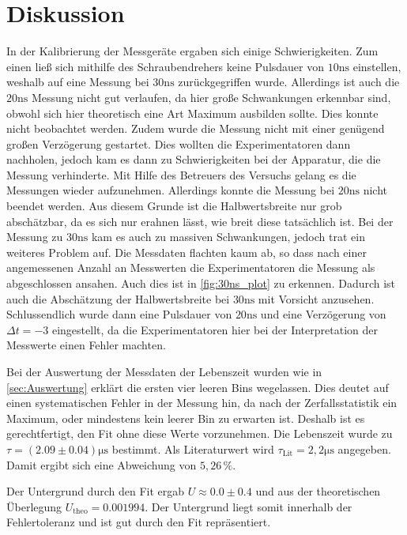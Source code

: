 \section{Diskussion}
\label{sec:Diskussion}

In der Kalibrierung der Messgeräte ergaben sich einige Schwierigkeiten.
Zum einen ließ sich mithilfe des Schraubendrehers keine Pulsdauer von $10 \unit{\nano\second}$ einstellen, weshalb auf eine Messung bei $30 \unit{\nano\second}$ zurückgegriffen wurde.
Allerdings ist auch die $20 \unit{\nano\second}$ Messung nicht gut verlaufen, da hier große Schwankungen erkennbar sind, obwohl sich hier theoretisch eine Art Maximum ausbilden sollte.
Dies konnte nicht beobachtet werden.
Zudem wurde die Messung nicht mit einer genügend großen Verzögerung gestartet.
Dies wollten die Experimentatoren dann nachholen, jedoch kam es dann zu Schwierigkeiten bei der Apparatur, die die Messung verhinderte.
Mit Hilfe des Betreuers des Versuchs gelang es die Messungen wieder aufzunehmen.
Allerdings konnte die Messung bei $20 \unit{\nano\second}$ nicht beendet werden.
Aus diesem Grunde ist die Halbwertsbreite nur grob abschätzbar, da es sich nur erahnen lässt, wie breit diese tatsächlich ist.
Bei der Messung zu $30 \unit{\nano\second}$ kam es auch zu massiven Schwankungen, jedoch trat ein weiteres Problem auf.
Die Messdaten flachten kaum ab, so dass nach einer angemessenen Anzahl an Messwerten die Experimentatoren die Messung als abgeschlossen ansahen.
Auch dies ist in \autoref{fig:30ns_plot} zu erkennen.
Dadurch ist auch die Abschätzung der Halbwertsbreite bei $30 \unit{\nano\second}$ mit Vorsicht anzusehen.
Schlussendlich wurde dann eine Pulsdauer von $20 \unit{\nano\second}$ und eine Verzögerung von $\Delta t = -3$ eingestellt, da die Experimentatoren hier bei der Interpretation der Messwerte einen Fehler machten.

Bei der Auswertung der Messdaten der Lebenszeit wurden wie in \autoref{sec:Auswertung} erklärt die ersten vier leeren Bins wegelassen.
Dies deutet auf einen systematischen Fehler in der Messung hin, da nach der Zerfallsstatistik ein Maximum, oder mindestens kein leerer Bin zu erwarten ist.
Deshalb ist es gerechtfertigt, den Fit ohne diese Werte vorzunehmen.
Die Lebenszeit wurde zu $\tau = (2.09\pm 0.04) \unit{\micro\second}$ bestimmt.
Als Literaturwert wird $\tau_\text{Lit} = 2,2 \unit{\micro\second}$ angegeben.
Damit ergibt sich eine Abweichung von $5,26 \, \% $.

Der Untergrund durch den Fit ergab $U \approx 0.0 \pm 0.4$ und aus der theoretischen Überlegung $U_\text{theo} = 0.001994$.
Der Untergrund liegt somit innerhalb der Fehlertoleranz und ist gut durch den Fit repräsentiert.